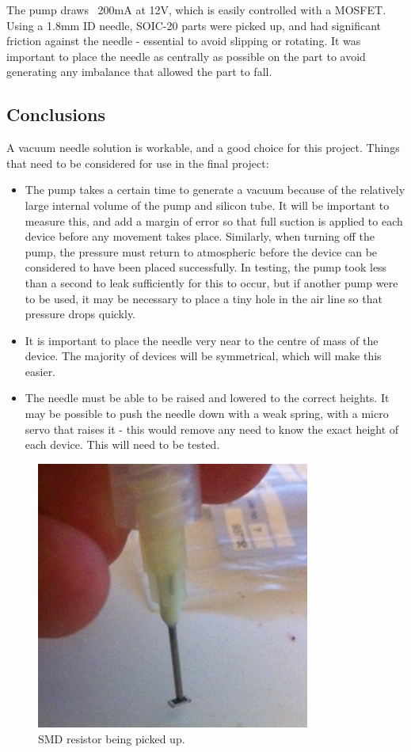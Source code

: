 The pump draws ~200mA at 12V, which is easily controlled with a MOSFET. Using a 1.8mm ID needle, SOIC-20 parts were picked up, 
and had significant friction against the needle - essential to avoid slipping or rotating. It was important to place the needle 
as centrally as possible on the part to avoid generating any imbalance that allowed the part to fall. 

\subsection{Conclusions}
A vacuum needle solution is workable, and a good choice for this project. Things that need to be considered for use in the final project:

\begin{itemize}
	\item	The pump takes a certain time to generate a vacuum because of the relatively large internal volume of the pump
		and silicon tube. It will be important to measure this, and add a margin of error so that full suction is applied
		to each device before any movement takes place. Similarly, when turning off the pump, the pressure must return to
		atmospheric before the device can be considered to have been placed successfully. In testing, the pump took
		less than a second to leak sufficiently for this to occur, but if another pump were to be used, it may be necessary
		to place a tiny hole in the air line so that pressure drops quickly.
	\item	It is important to place the needle very near to the centre of mass of the device. The majority of devices will be
		symmetrical, which will make this easier.
	\item	The needle must be able to be raised and lowered to the correct heights. It may be possible to push the needle down
		with a weak spring, with a micro servo that raises it - this would remove any need to know the exact height of each
		device. This will need to be tested.
\end{itemize}

\begin{figure}[ht!]
\centering
\includegraphics[width=90mm]{resources/needle_with_resistor.jpg}
\caption{SMD resistor being picked up.}
\label{overflow}
\end{figure}

